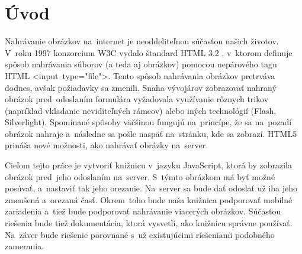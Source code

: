 \chapter{Úvod}

Nahrávanie obrázkov na~internet je neoddeliteľnou súčasťou našich životov. V~roku 1997 konzorcium W3C vydalo štandard HTML 3.2 \cite{html32}, v~ktorom definuje spôsob nahrávania súborov (a teda aj obrázkov) pomocou nepárového tagu HTML \hbox{<input type="file"\textgreater}. Tento spôsob nahrávania obrázkov pretrváva dodnes, avšak požiadavky sa zmenili. Snaha vývojárov zobrazovať nahraný obrázok pred~odoslaním formulára vyžadovala využívanie rôznych trikov (napríklad vkladanie neviditeľných rámcov) alebo iných technológií (Flash, Silverlight). Spomínané spôsoby väčšinou fungujú na~princípe, že sa na~pozadí obrázok nahraje a~následne sa pošle naspäť na~stránku, kde sa zobrazí. HTML5 prináša nové možnosti, ako nahrávať obrázky na~server.

Cieľom tejto práce je vytvoriť knižnicu v~jazyku JavaScript, ktorá by zobrazila obrázok pred~jeho odoslaním na~server. S~týmto obrázkom má byť možné posúvať, a~nastaviť tak jeho orezanie. Na~server sa bude dať odoslať už iba jeho zmenšená a~orezaná časť. Okrem~toho bude naša knižnica podporovať mobilné zariadenia a~tiež bude podporovať nahrávanie viacerých obrázkov. Súčasťou riešenia bude tiež dokumentácia, ktorá vysvetlí, ako knižnicu správne používať. Na~záver bude riešenie porovnané s~už existujúcimi riešeniami podobného zamerania.